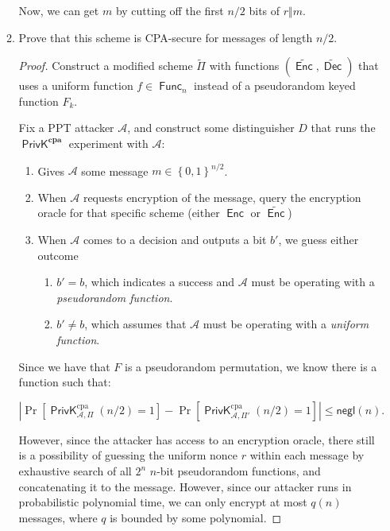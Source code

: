 \documentclass{article}
\DeclareMathOperator{\Func}{\textsf{Func}}
\DeclareMathOperator{\PrivK}{\textsf{PrivK}}
\DeclareMathOperator{\Enc}{\textsf{Enc}}
\DeclareMathOperator{\Dec}{\textsf{Dec}}
\begin{document}
\begin{enumerate}
\begin{enumerate}
        Now, we can get $m$ by cutting off the first $n / 2$ bits of $r \Vert m$.
      \item Prove that this scheme is CPA-secure for messages of length $n / 2$.

        \begin{proof}
          Construct a modified scheme $\tilde{\Pi}$ with functions
          $(\tilde{\Enc}, \tilde{\Dec})$ that uses a uniform function $f \in
          \Func_n$ instead of a pseudorandom keyed function $F_k$.

          Fix a PPT attacker $\mathcal{A}$, and construct some distinguisher $D$
          that runs the $\PrivK^{\textbf{cpa}}$ experiment with $\mathcal{A}$:
          \begin{enumerate}
            \item Gives $\mathcal{A}$ some message $m \in \left\{0, 1\right\}^{n
              / 2}$.
            \item When $\mathcal{A}$ requests encryption of the message, query
              the encryption oracle for that specific scheme (either $\Enc$ or
              $\tilde{\Enc}$)
            \item When $\mathcal{A}$ comes to a decision and outputs a bit $b'$,
              we guess either outcome
              \begin{enumerate}
                \item $b' = b$, which indicates a success and $\mathcal{A}$ must
                  be operating with a \textit{pseudorandom function}.
                \item $b' \neq b$, which assumes that $\mathcal{A}$ must be
                  operating with a \textit{uniform function}.
              \end{enumerate}
          \end{enumerate}

          Since we have that $F$ is a pseudorandom permutation, we know there
          is a function such that:

          \[
            \left| \Pr\left[\PrivK_{\mathcal{A}, \Pi}^\text{cpa}(n/2) = 1\right] - 
            \Pr\left[\PrivK_{\mathcal{A}, \Pi\prime}^\text{cpa}(n/2) =
            1 \right] \right| \leq \textsf{negl}(n).
          \]

          However, since the attacker has access to an encryption oracle, there
          still is a possibility of guessing the uniform nonce $r$ within each
          message by exhaustive search of all $2^n$ $n$-bit pseudorandom
          functions, and concatenating it to the message. However, since our
          attacker runs in probabilistic polynomial time, we can only encrypt at
          most $q(n)$ messages, where $q$ is bounded by some polynomial.


\end{proof}
\end{enumerate}
\end{enumerate}
\end{document}
